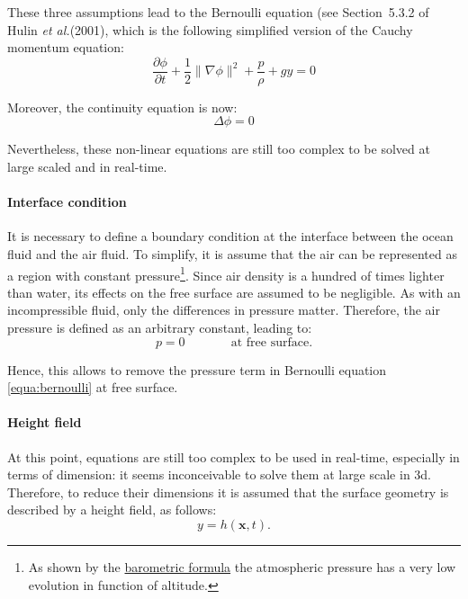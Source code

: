 \documentclass[final]{jcgt}
\def\etal{\emph{et al.}\xspace}
\begin{document}
These three assumptions lead to the Bernoulli equation (see Section~5.3.2 of Hulin \etal (2001), which is the following simplified version of the Cauchy momentum equation:
\begin{equation}
	\frac{\partial \phi}{\partial t} + \frac{1}{2}\|\nabla\phi\|^2 + \frac{p}{\rho} + gy = 0
	\label{equa:bernoulli}
\end{equation}

Moreover, the continuity equation is now:
\begin{equation}
	\Delta \phi = 0 \label{equa:continuityS}
\end{equation}

Nevertheless, these non-linear equations are still too complex to be solved at large scaled and in real-time.

\paragraph{Interface condition}
It is necessary to define a boundary condition at the interface between the ocean fluid and the air fluid.
To simplify, it is assume that the air can be represented as a region with constant pressure\footnote{As shown by the \href{https://en.wikipedia.org/wiki/Barometric_formula}{barometric formula} the atmospheric pressure has a very low evolution in function of altitude.}.
Since air density is a hundred of times lighter than water, its effects on the free surface are assumed to be negligible.
As with an incompressible fluid, only the differences in pressure matter.
Therefore, the air pressure is defined as an arbitrary constant, leading to:
\begin{equation}
	p = 0\text{~~~~~~~~~~~at free surface.}
\end{equation}

Hence, this allows to remove the pressure term in Bernoulli equation \ref{equa:bernoulli} at free surface.

\paragraph{Height field}
At this point, equations are still too complex to be used in real-time, especially in terms of dimension:
it seems inconceivable to solve them at large scale in 3d.
Therefore, to reduce their dimensions it is assumed that the surface geometry is described by a height field, as follows:
\begin{equation}
	y = h(\mathbf x, t).
\end{equation}
\end{document}

